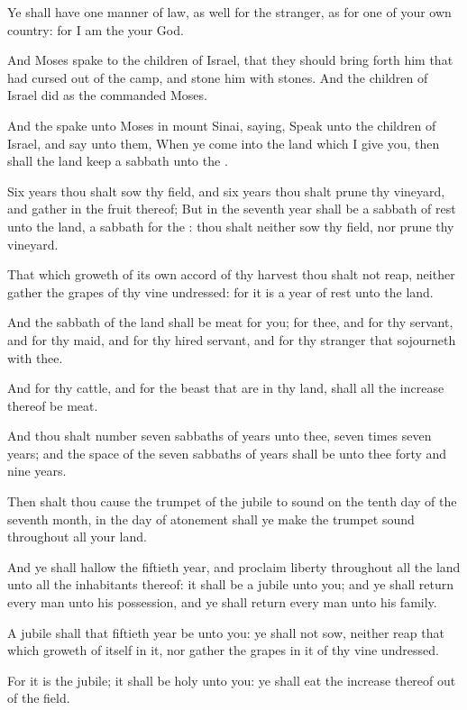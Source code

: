 \Verse Ye shall have one manner of law, as well for the stranger, as for one of your own country: for I am the \LORD your God.

\Verse And Moses spake to the children of Israel, that they should bring forth him that had cursed out of the camp, and stone him with stones. And the children of Israel did as the \LORD commanded Moses.

\Chapter
\Verse And the \LORD spake unto Moses in mount Sinai, saying, \Verse Speak unto the children of Israel, and say unto them, When ye come into the land which I give you, then shall the land keep a sabbath unto the \LORD.

\Verse Six years thou shalt sow thy field, and six years thou shalt prune thy vineyard, and gather in the fruit thereof; \Verse But in the seventh year shall be a sabbath of rest unto the land, a sabbath for the \LORD: thou shalt neither sow thy field, nor prune thy vineyard.

\Verse That which groweth of its own accord of thy harvest thou shalt not reap, neither gather the grapes of thy vine undressed: for it is a year of rest unto the land.

\Verse And the sabbath of the land shall be meat for you; for thee, and for thy servant, and for thy maid, and for thy hired servant, and for thy stranger that sojourneth with thee.

\Verse And for thy cattle, and for the beast that are in thy land, shall all the increase thereof be meat.

\Verse And thou shalt number seven sabbaths of years unto thee, seven times seven years; and the space of the seven sabbaths of years shall be unto thee forty and nine years.

\Verse Then shalt thou cause the trumpet of the jubile to sound on the tenth day of the seventh month, in the day of atonement shall ye make the trumpet sound throughout all your land.

\Verse And ye shall hallow the fiftieth year, and proclaim liberty throughout all the land unto all the inhabitants thereof: it shall be a jubile unto you; and ye shall return every man unto his possession, and ye shall return every man unto his family.

\Verse A jubile shall that fiftieth year be unto you: ye shall not sow, neither reap that which groweth of itself in it, nor gather the grapes in it of thy vine undressed.

\Verse For it is the jubile; it shall be holy unto you: ye shall eat the increase thereof out of the field.

